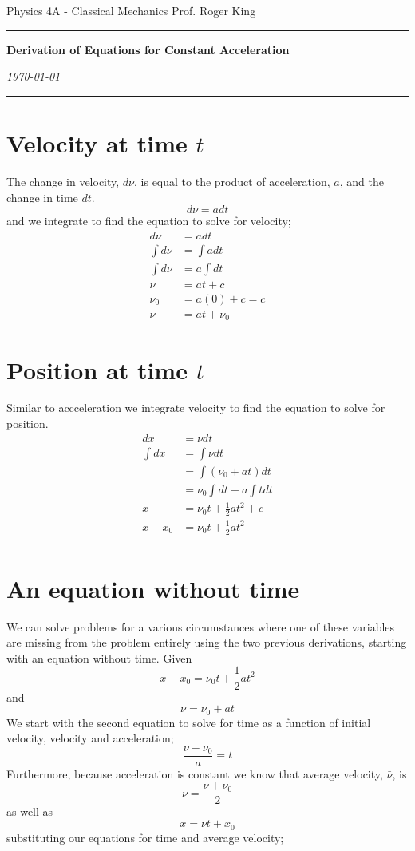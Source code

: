 \documentclass{article}
\begin{document}
\flushleft
Physics 4A - Classical Mechanics \hfill Prof. Roger King\\
\hrule

\begin{center}
    \vspace{14pt}
    \textbf{\LARGE Derivation of Equations for Constant Acceleration} \\
    \vspace{12pt}

    \textit{\today}
    \vspace{14pt}
\end{center}

\hrule

\section*{Velocity at time $t$}
The change in velocity, $d\nu$, is equal to the product of acceleration, $a$, and the change in time $dt$.
\[
	d\nu = a dt
\]
and we integrate to find the equation to solve for velocity;
\begin{align*}
	d\nu &= adt \\
	\int d\nu &= \int adt \\
	\int d\nu &= a \int dt \\
	\nu &= at + c \\
	\nu_0 &= a(0) + c = c \\
	\nu &= at + \nu_0
\end{align*}

\section*{Position at time $t$}
Similar to accceleration we integrate velocity to find the equation to solve for position.
\begin{align*}
	dx &= \nu dt \\
	\int dx &= \int \nu dt \\
	&= \int \left( \nu_0 + at \right) dt \\
	&= \nu_0 \int dt + a \int tdt \\
	x &= \nu_0t + \frac{1}{2} at^2 + c \\
	x-x_0 &= \nu_0t + \frac{1}{2} at^2 \\
\end{align*}

\section*{An equation without time}
We can solve problems for a various circumstances where one of these variables are missing from the problem entirely using the two previous derivations, starting with an equation without time. Given
\[
	x - x_0 = \nu_0 t + \frac{1}{2} at^2
\]
and
\[
	\nu = \nu_0 + at
\]
We start with the second equation to solve for time as a function of initial velocity, velocity and acceleration;
\[
	\frac{\nu - \nu_0}{a} = t
\]
Furthermore, because acceleration is constant we know that average velocity, $\bar{\nu}$, is
\[
	\bar{\nu} = \frac{\nu + \nu_0}{2}
\]
as well as
\[
	x = \bar{\nu}t + x_0
\]
substituting our equations for time and average velocity;
\end{document}
